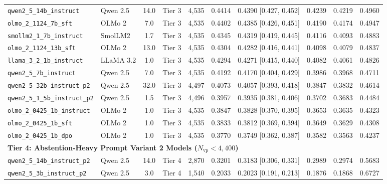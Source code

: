 \documentclass[11pt,a4paper]{article}
\begin{document}
\begin{table}[htbp]
\begin{adjustbox}{max width=\textwidth}
\begin{tabular}{l l c c c c c c c c}
\texttt{qwen2\_5\_14b\_instruct} & Qwen 2.5 & 14.0 & Tier 3 & 4,535 & 0.4414 & 0.4390 [0.427, 0.452] & 0.4239 & 0.4219 & 0.4960 \\
\texttt{olmo\_2\_1124\_7b\_sft} & OLMo 2 & 7.0 & Tier 3 & 4,535 & 0.4402 & 0.4385 [0.426, 0.451] & 0.4190 & 0.4174 & 0.4947 \\
\texttt{smollm2\_1\_7b\_instruct} & SmolLM2 & 1.7 & Tier 3 & 4,535 & 0.4345 & 0.4319 [0.419, 0.445] & 0.4116 & 0.4093 & 0.4883 \\
\texttt{olmo\_2\_1124\_13b\_sft} & OLMo 2 & 13.0 & Tier 3 & 4,535 & 0.4304 & 0.4282 [0.416, 0.441] & 0.4098 & 0.4079 & 0.4837 \\
\texttt{llama\_3\_2\_1b\_instruct} & LLaMA 3.2 & 1.0 & Tier 3 & 4,535 & 0.4294 & 0.4271 [0.415, 0.440] & 0.4082 & 0.4061 & 0.4826 \\
\texttt{qwen2\_5\_7b\_instruct} & Qwen 2.5 & 7.0 & Tier 3 & 4,535 & 0.4192 & 0.4170 [0.404, 0.429] & 0.3986 & 0.3968 & 0.4711 \\
\texttt{qwen2\_5\_32b\_instruct\_p2} & Qwen 2.5 & 32.0 & Tier 3 & 4,497 & 0.4073 & 0.4057 [0.393, 0.418] & 0.3847 & 0.3832 & 0.4614 \\
\texttt{qwen2\_5\_1\_5b\_instruct\_p2}& Qwen 2.5 & 1.5 & Tier 3 & 4,496 & 0.3957 & 0.3935 [0.381, 0.406] & 0.3702 & 0.3683 & 0.4484 \\
\texttt{olmo\_2\_0425\_1b\_instruct} & OLMo 2 & 1.0 & Tier 3 & 4,535 & 0.3847 & 0.3828 [0.370, 0.395] & 0.3653 & 0.3635 & 0.4323 \\
\texttt{olmo\_2\_0425\_1b\_sft} & OLMo 2 & 1.0 & Tier 3 & 4,535 & 0.3833 & 0.3812 [0.369, 0.394] & 0.3649 & 0.3629 & 0.4308 \\
\texttt{olmo\_2\_0425\_1b\_dpo} & OLMo 2 & 1.0 & Tier 3 & 4,535 & 0.3770 & 0.3749 [0.362, 0.387] & 0.3582 & 0.3563 & 0.4237 \\
\midrule
\multicolumn{10}{l}{\textbf{Tier 4: Abstention-Heavy Prompt Variant 2 Models ($N_{\text{vp}} < 4,400$)}} \\
\texttt{qwen2\_5\_14b\_instruct\_p2}& Qwen 2.5 & 14.0 & Tier 4 & 2,870 & 0.3201 & 0.3183 [0.306, 0.331] & 0.2989 & 0.2974 & 0.5683 \\
\texttt{qwen2\_5\_3b\_instruct\_p2} & Qwen 2.5 & 3.0 & Tier 4 & 1,540 & 0.2033 & 0.2023 [0.191, 0.213] & 0.1876 & 0.1868 & 0.6727 \\
\bottomrule
\end{tabular}
\end{adjustbox}
\end{table}

\end{document}
